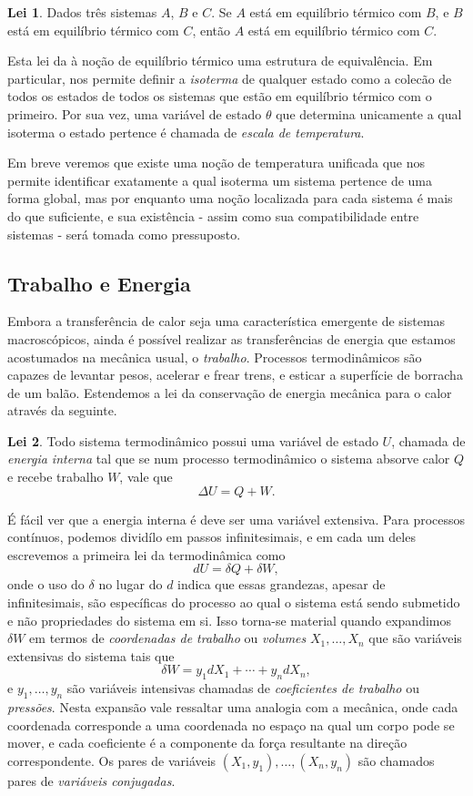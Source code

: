 \documentclass[a4paper, 12pt]{article}
\theoremstyle{definition}
\theoremstyle{definition}
\newtheorem{law}{Lei}
\begin{document}
\begin{law}
    Dados três sistemas $A$, $B$ e $C$. Se $A$ está em equilíbrio térmico com $B$, e $B$ está em
    equilíbrio térmico com $C$, então $A$ está em equilíbrio térmico com $C$.
\end{law}

Esta lei da à noção de equilíbrio térmico uma estrutura de equivalência. Em particular, nos permite definir
a \textit{isoterma} de qualquer estado como a colecão de todos os estados de todos os sistemas que estão
em equilíbrio térmico com o primeiro. Por sua vez, uma variável de estado $\theta$ que determina unicamente
a qual isoterma o estado pertence é chamada de \textit{escala de temperatura}. 

Em breve veremos que existe uma noção de temperatura unificada que nos permite identificar exatamente
a qual isoterma um sistema pertence de uma forma global, mas por enquanto uma noção localizada para cada sistema
é mais do que suficiente, e sua existência - assim como sua compatibilidade entre sistemas - será tomada como
pressuposto. 

\subsection{Trabalho e Energia}

Embora a transferência de calor seja uma característica emergente de sistemas macroscópicos, ainda é
possível realizar as transferências de energia que estamos acostumados na mecânica usual, o
\textit{trabalho}. Processos termodinâmicos são capazes de levantar pesos, acelerar e frear trens, 
e esticar a superfície de borracha de um balão. Estendemos a lei da conservação de energia mecânica para
o calor através da seguinte.

\begin{law}
    Todo sistema termodinâmico possui uma variável de estado $U$, chamada de \textit{energia interna} tal
    que se num processo termodinâmico o sistema absorve calor $Q$ e recebe trabalho $W$, vale que
    $$\Delta U=Q+W.$$
\end{law}

É fácil ver que a energia interna é deve ser uma variável extensiva. Para processos contínuos, podemos 
dividílo em passos infinitesimais, e em cada um deles escrevemos a primeira lei da termodinâmica como
$$dU=\delta Q+\delta W,$$
onde o uso do $\delta$ no lugar do $d$ indica que essas grandezas, apesar de infinitesimais, são específicas
do processo ao qual o sistema está sendo submetido e não propriedades do sistema em si. Isso torna-se
material quando expandimos $\delta W$ em termos de \textit{coordenadas de trabalho} ou \textit{volumes} 
$X_1,\dots,X_n$ que são variáveis extensivas do sistema tais que 
$$\delta W=y_1dX_1+\cdots+y_ndX_n,$$
e $y_1,\dots,y_n$ são variáveis intensivas chamadas de \textit{coeficientes de trabalho} ou \textit{pressões}. 
Nesta expansão vale ressaltar uma analogia com a mecânica, onde cada coordenada corresponde a uma coordenada 
no espaço na qual um corpo pode se mover, e cada coeficiente é a componente da força resultante na direção 
correspondente. Os pares de variáveis $(X_1, y_1),\dots,(X_n,y_n)$ são chamados pares de \textit{variáveis 
conjugadas}.
\end{document}
